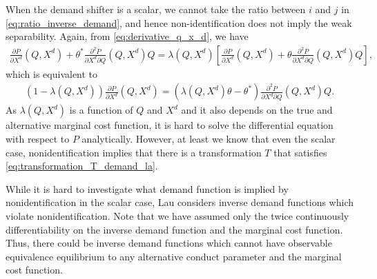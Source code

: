 \documentclass[11pt, a4paper]{article}
\theoremstyle{remark}
\begin{document}
When the demand shifter is a scalar, we cannot take the ratio between $i$ and $j$ in \eqref{eq:ratio_inverse_demand}, and hence non-identification does not imply the weak separability.
Again, from \eqref{eq:derivative_q_x_d}, we have
\begin{align}
    \frac{\partial P}{\partial X^{d}}(Q, X^{d}) + \theta^{*} \frac{\partial^2 P}{\partial X^{d}\partial Q}(Q, X^{d})Q = \lambda(Q, X^{d}) \left[\frac{\partial P}{\partial X^{d}}(Q, X^{d}) + \theta\frac{\partial^2 P}{\partial X^{d}\partial Q}(Q, X^{d})Q \right], 
\end{align}
which is equivalent to
\begin{align}
    (1 - \lambda(Q, X^{d}))\frac{\partial P}{\partial X^{d}}(Q, X^{d}) = (\lambda(Q, X^{d})\theta  - \theta^{*})\frac{\partial^2 P}{\partial X^{d}\partial Q}(Q, X^{d})Q.
\end{align}
As $\lambda(Q, X^{d})$ is a function of $Q$ and $X^{d}$ and it also depends on the true and alternative marginal cost function, it is hard to solve the differential equation with respect to $P$ analytically.
However, at least we know that even the scalar case, nonidentification implies that there is a transformation $T$ that satisfies \eqref{eq:transformation_T_demand_la}.


While it is hard to investigate what demand function is implied by nonidentification in the scalar case, Lau considers inverse demand functions which violate nonidentification.
Note that we have assumed only the twice continuously differentiability on the inverse demand function and the marginal cost function.
Thus, there could be inverse demand functions which cannot have observable equivalence equilibrium to any alternative conduct parameter and the marginal cost function.
\end{document}
